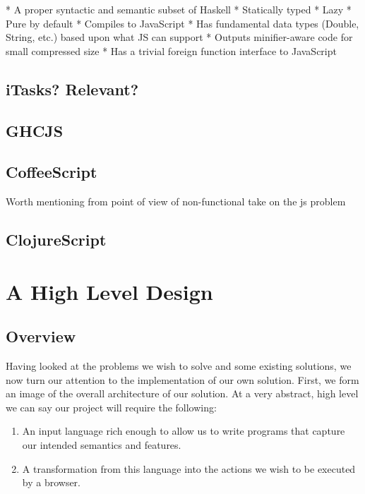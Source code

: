 \documentclass[11pt]{article}
\begin{document}
* A proper syntactic and semantic subset of Haskell
* Statically typed
* Lazy
* Pure by default
* Compiles to JavaScript
* Has fundamental data types (Double, String, etc.) based upon what JS can support
* Outputs minifier-aware code for small compressed size
* Has a trivial foreign function interface to JavaScript

\subsection{iTasks? Relevant?}

\subsection{GHCJS}

\subsection{CoffeeScript}
Worth mentioning from point of view of non-functional take on the js problem

\subsection{ClojureScript}

\pagebreak

\section{A High Level Design}
\subsection{Overview}
Having looked at the problems we wish to solve and some existing solutions, we now turn our attention to the implementation of our own solution. First,
we form an image of the overall architecture of our solution. At a
very abstract, high level we can say our project will require the following:

\begin{enumerate}
	\item An input language rich enough to allow us to write programs
		  that capture our intended semantics and features.
	\item A transformation from this language into the actions we 
	 	  wish to be executed by a browser.
\end{enumerate}
\end{document}
